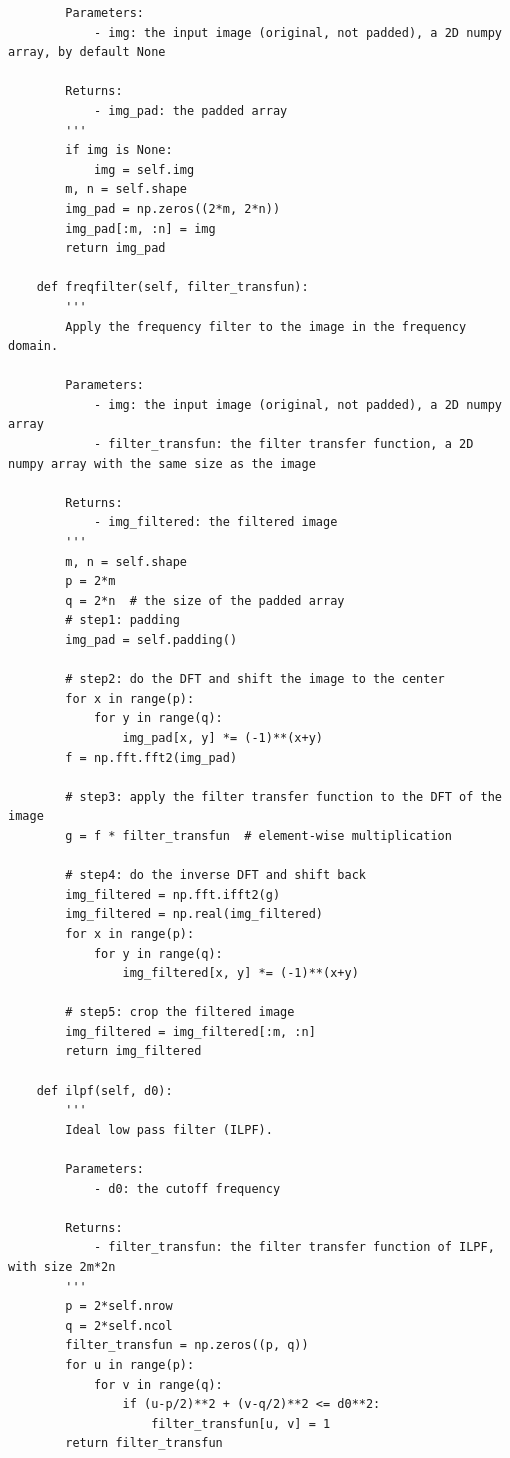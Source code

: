 \documentclass[UTF8]{ctexart}
\begin{document}
\begin{lstlisting}
        Parameters:
            - img: the input image (original, not padded), a 2D numpy array, by default None

        Returns:
            - img_pad: the padded array
        '''
        if img is None:
            img = self.img
        m, n = self.shape
        img_pad = np.zeros((2*m, 2*n))
        img_pad[:m, :n] = img
        return img_pad
    
    def freqfilter(self, filter_transfun):
        '''
        Apply the frequency filter to the image in the frequency domain.
        
        Parameters:
            - img: the input image (original, not padded), a 2D numpy array
            - filter_transfun: the filter transfer function, a 2D numpy array with the same size as the image
        
        Returns:
            - img_filtered: the filtered image
        '''
        m, n = self.shape
        p = 2*m
        q = 2*n  # the size of the padded array
        # step1: padding
        img_pad = self.padding()
        
        # step2: do the DFT and shift the image to the center
        for x in range(p):
            for y in range(q):
                img_pad[x, y] *= (-1)**(x+y)
        f = np.fft.fft2(img_pad)
        
        # step3: apply the filter transfer function to the DFT of the image
        g = f * filter_transfun  # element-wise multiplication
        
        # step4: do the inverse DFT and shift back
        img_filtered = np.fft.ifft2(g)
        img_filtered = np.real(img_filtered)
        for x in range(p):
            for y in range(q):
                img_filtered[x, y] *= (-1)**(x+y)

        # step5: crop the filtered image
        img_filtered = img_filtered[:m, :n]
        return img_filtered
        
    def ilpf(self, d0):
        '''
        Ideal low pass filter (ILPF).
        
        Parameters:
            - d0: the cutoff frequency
            
        Returns:
            - filter_transfun: the filter transfer function of ILPF, with size 2m*2n
        '''
        p = 2*self.nrow
        q = 2*self.ncol
        filter_transfun = np.zeros((p, q))
        for u in range(p):
            for v in range(q):
                if (u-p/2)**2 + (v-q/2)**2 <= d0**2:
                    filter_transfun[u, v] = 1
        return filter_transfun



\end{lstlisting}
\end{document}
